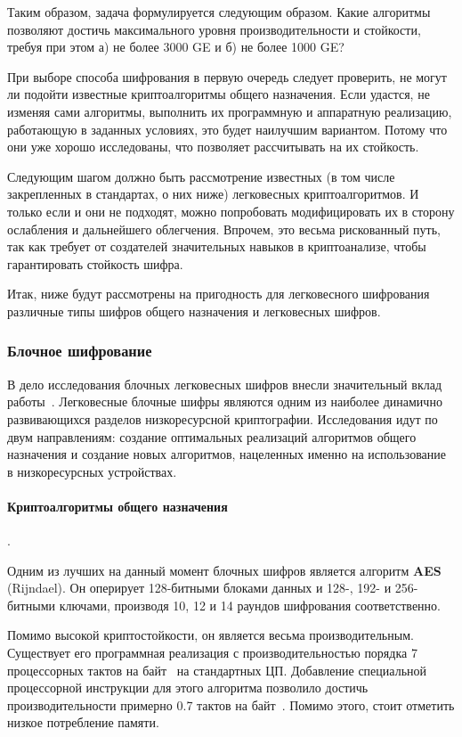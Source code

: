 Таким образом, задача формулируется следующим образом. Какие алгоритмы позволяют достичь максимального уровня производительности и стойкости, требуя при этом а) не более 3000 GE и б) не более 1000 GE?

При выборе способа шифрования в первую очередь следует проверить, не могут ли подойти известные криптоалгоритмы общего назначения. Если удастся, не изменяя сами алгоритмы, выполнить их программную и аппаратную реализацию, работающую в заданных условиях, это будет наилучшим вариантом. Потому что они уже хорошо исследованы, что позволяет рассчитывать на их стойкость.

Следующим шагом должно быть рассмотрение известных (в том числе закрепленных в стандартах, о них ниже) легковесных криптоалгоритмов. И только если и они не подходят, можно попробовать модифицировать их в сторону ослабления и дальнейшего облегчения. Впрочем, это весьма рискованный путь, так как требует от создателей значительных навыков в криптоанализе, чтобы гарантировать стойкость шифра.

Итак, ниже будут рассмотрены на пригодность для легковесного шифрования различные типы шифров общего назначения и легковесных шифров.

\subsubsection{Блочное шифрование}

В дело исследования блочных легковесных шифров внесли значительный вклад работы~\cite{src30,src27}. Легковесные блочные шифры являются одним из наиболее динамично развивающихся разделов низкоресурсной криптографии. Исследования идут по двум направлениям: создание оптимальных реализаций алгоритмов общего назначения и создание новых алгоритмов, нацеленных именно на использование в низкоресурсных устройствах.

\paragraph{Криптоалгоритмы общего назначения}. \newline

Одним из лучших на данный момент блочных шифров является алгоритм \textbf{AES} (Rijndael). Он оперирует 128-битными блоками данных и 128-, 192- и 256-битными ключами, производя 10, 12 и 14 раундов шифрования соответственно.

Помимо высокой криптостойкости, он является весьма производительным. Существует его программная реализация с производительностью порядка 7 процессорных тактов на байт~\cite{src31} на стандартных ЦП. Добавление специальной процессорной инструкции для этого алгоритма позволило достичь производительности примерно 0.7 тактов на байт~\cite{src32}.  Помимо этого, стоит отметить низкое потребление памяти.


